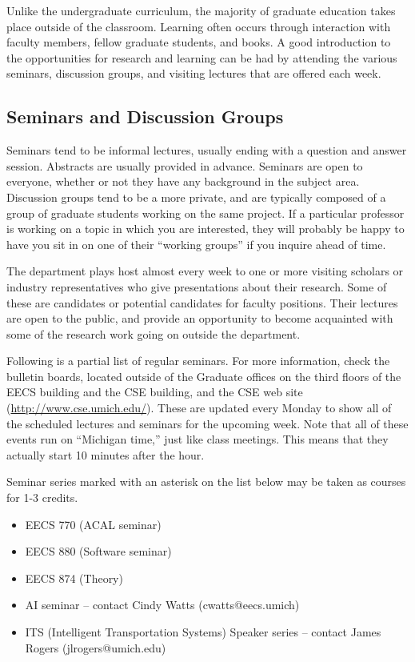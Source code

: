\documentclass[11pt]{article}
\begin{document}
Unlike the undergraduate curriculum, the majority of graduate
education takes place outside of the classroom.  Learning often occurs
through interaction with faculty members, fellow graduate students,
and books.  A good introduction to the opportunities for research and
learning can be had by attending the various seminars, discussion
groups, and visiting lectures that are offered each week.
\subsection{Seminars and Discussion Groups}
\label{sec-6_1}

Seminars tend to be informal lectures, usually ending with a question
and answer session.  Abstracts are usually provided in advance.
Seminars are open to everyone, whether or not they have any background
in the subject area.  Discussion groups tend to be a more private, and
are typically composed of a group of graduate students working on the
same project.  If a particular professor is working on a topic in
which you are interested, they will probably be happy to have you sit
in on one of their “working groups” if you inquire ahead of time.

The department plays host almost every week to one or more visiting
scholars or industry representatives who give presentations about
their research.  Some of these are candidates or potential candidates
for faculty positions.  Their lectures are open to the public, and
provide an opportunity to become acquainted with some of the research
work going on outside the department.

Following is a partial list of regular seminars.  For more
information, check the bulletin boards, located outside of the
Graduate offices on the third floors of the EECS building and the CSE
building, and the CSE web site (\href{http://www.cse.umich.edu/}{http://www.cse.umich.edu/}).  These are
updated every Monday to show all of the scheduled lectures and
seminars for the upcoming week.  Note that all of these events run on
“Michigan time,” just like class meetings.  This means that they
actually start 10 minutes after the hour.

Seminar series marked with an asterisk on the list below may be taken as courses for 1-3 credits.

\begin{itemize}
\item EECS 770 (ACAL seminar)
\item EECS 880 (Software seminar)
\item EECS 874 (Theory)
\item AI seminar -- contact Cindy Watts (cwatts@eecs.umich)
\item ITS (Intelligent Transportation Systems) Speaker series -- contact James Rogers (jlrogers@umich.edu)
\end{itemize}
\end{document}

